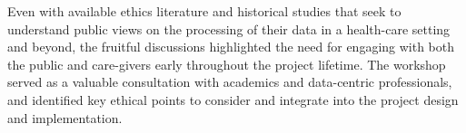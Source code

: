 \documentclass{article}
\begin{document}
Even with available ethics literature and historical studies that seek
to understand public views on the processing of their data in a
health-care setting and beyond, the fruitful discussions highlighted
the need for engaging with both the public and care-givers early
throughout the project lifetime. The workshop served as a valuable
consultation with academics and data-centric professionals, and
identified key ethical points to consider and integrate into the
project design and implementation. 


\end{document}
